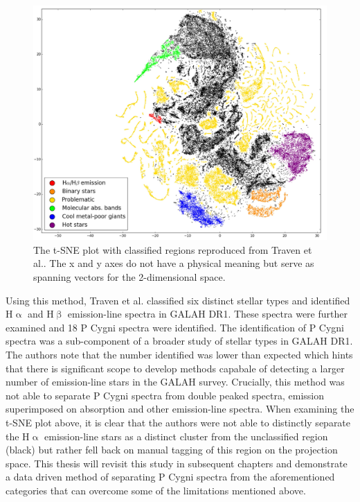 \begin{figure}[!htb]
\centering
\includegraphics[scale=0.40]{figures/tsne traven.png}
\caption{The t-SNE plot with classified regions reproduced from Traven et al.\cite{traven2017galah}. The x and y axes do not have a physical meaning but serve as spanning vectors for the 2-dimensional space.}
\end{figure}

Using this method, Traven et al. classified six distinct stellar types and identified H$\upalpha$ and H$\upbeta$ emission-line spectra in GALAH DR1. These spectra were further examined and 18 P Cygni spectra were identified. The identification of P Cygni spectra was a sub-component of a broader study of stellar types in GALAH DR1. The authors note that the number identified was lower than expected which hints that there is significant scope to develop methods capabale of detecting a larger number of emission-line stars in the GALAH survey. Crucially, this method was not able to separate P Cygni spectra from double peaked spectra, emission superimposed on absorption and other emission-line spectra. When examining the t-SNE plot above, it is clear that the authors were not able to distinctly separate the H$\upalpha$ emission-line stars as a distinct cluster from the unclassified region (black) but rather fell back on manual tagging of this region on the projection space. This thesis will revisit this study in subsequent chapters and demonstrate a data driven method of separating P Cygni spectra from the aforementioned categories that can overcome some of the limitations mentioned above.

